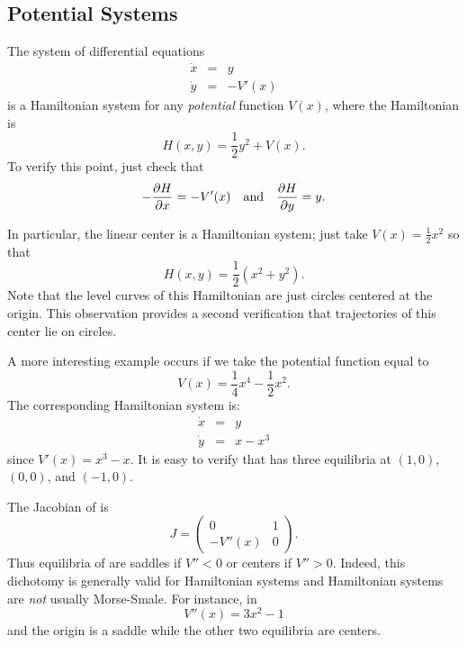 \documentclass{ximera}
\begin{document}
\subsection*{Potential Systems}
The system of differential equations
\begin{equation}  \label{e:hamex}
\begin{array}{rcl} 
\dot{x} & = & y \\
\dot{y} & = & -V'(x) 
\end{array}
\end{equation}
is a Hamiltonian system for any {\em potential\/} function $V(x)$,
where the Hamiltonian is
\[
H(x,y) = \frac{1}{2}y^2 + V(x).
\]
To verify this point, just check that 
\[
-\frac{\partial H}{\partial x} = -V'(x) \quad\mbox{and}\quad \frac{\partial H}{\partial y} = y.
\]

In particular, the linear center is a 
Hamiltonian system; just take 
$V(x)=\frac{1}{2}x^2$ so that 
\[
H(x,y) = \frac{1}{2}(x^2+y^2).
\]
Note that the level curves of this Hamiltonian are just circles centered 
at the origin.  This observation provides a second verification that 
trajectories of this center lie on circles.

A more interesting example occurs if we take the potential function 
equal to 
\[
V(x) = \frac{1}{4}x^4 - \frac{1}{2}x^2.
\]
The corresponding Hamiltonian system is:
\begin{equation*}  \label{e:hamex1}
\begin{array}{rcl} 
\dot{x} & = & y \\
\dot{y} & = & x-x^3 
\end{array}
\end{equation*}%
since $V'(x)=x^3-x$.  It is easy to verify that  has three 
equilibria at $(1,0)$, $(0,0)$, and $(-1,0)$.  

The Jacobian of  is
\[
J = \left(\begin{array}{cc}  0 & 1 \\ -V''(x) & 0 \end{array}\right).
\]
Thus equilibria of  are saddles 
if $V''<0$ or centers if $V''>0$.
Indeed, this dichotomy is generally valid for Hamiltonian systems and 
Hamiltonian systems are {\em not\/} usually Morse-Smale.  For instance, in
\[
V''(x) = 3x^2-1
\]
and the origin is a saddle while the other two equilibria are centers. 
\end{document}
